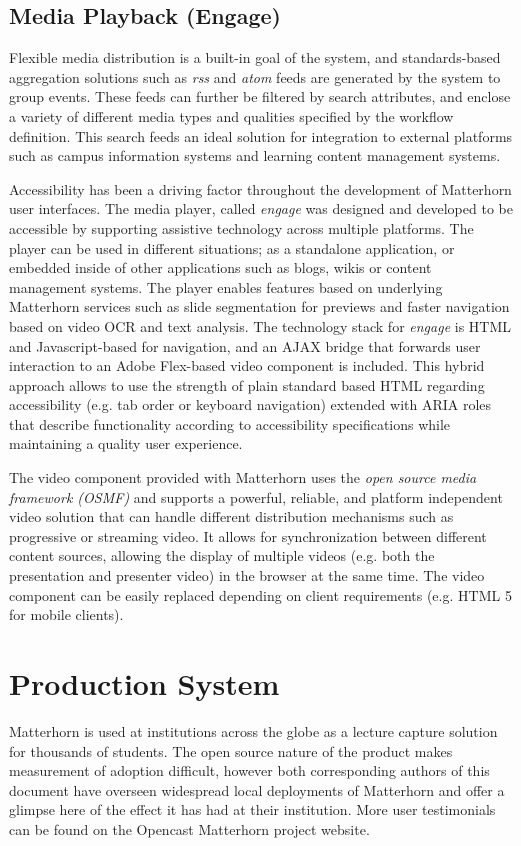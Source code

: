 \documentclass[letterpaper]{sig-alternate}
\begin{document}
\subsection{Media Playback (Engage)}
Flexible media distribution is a built-in goal of the system, and standards-based aggregation solutions such as \emph{rss} and \emph{atom} feeds are generated by the system to group events. These feeds can further be filtered by search attributes, and enclose a variety of different media types and qualities specified by the workflow definition.  This search feeds an ideal solution for integration to external platforms such as campus information systems and learning content management systems.

Accessibility has been a driving factor throughout the development of Matterhorn user interfaces. The media player, called \emph{engage} was designed and developed to be accessible by supporting assistive technology across multiple platforms. The player can be used in different situations; as a standalone application, or embedded inside of other applications such as blogs, wikis or content management systems. The player enables features based on underlying Matterhorn services such as slide segmentation for previews and faster navigation based on video OCR and text analysis. The technology stack for \emph{engage} is HTML and Javascript-based for navigation, and an AJAX bridge that forwards user interaction to an Adobe Flex-based video component is included.  This hybrid approach allows to use the strength of plain standard based HTML regarding accessibility (e.g. tab order or keyboard navigation) extended with ARIA roles that describe functionality according to accessibility specifications while maintaining a quality user experience. 

The video component provided with Matterhorn uses the \emph{open source media framework (OSMF)} and supports a powerful, reliable, and platform independent video solution that can handle different distribution mechanisms such as progressive or streaming video.  It allows for synchronization between different content sources, allowing the display of multiple videos (e.g. both the presentation and presenter video) in the browser at the same time.  The video component can be easily replaced depending on client requirements (e.g. HTML 5 for mobile clients).

\section{Production System}
Matterhorn is used at institutions across the globe as a lecture capture solution for thousands of students.  The open source nature of the product makes measurement of adoption difficult, however both corresponding authors of this document have overseen widespread local deployments of Matterhorn and offer a glimpse here of the effect it has had at their institution.  More user testimonials can be found on the Opencast Matterhorn project website.
\end{document}
